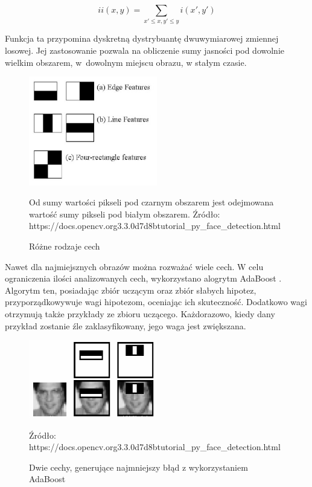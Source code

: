\documentclass[oneside, eng]{mgr}
\begin{document}
\begin{equation}
	ii(x,y) = \sum_{x' \leq x, y' \leq y} i(x',y')
\end{equation}

Funkcja ta przypomina dyskretną dystrybuantę dwuwymiarowej zmiennej losowej. Jej zastosowanie pozwala na obliczenie sumy jasności pod dowolnie wielkim obszarem, w~dowolnym miejscu obrazu, w stałym czasie.

\begin{figure}
\centering
	\includegraphics[width=0.50\textwidth,natwidth=610,natheight=642]{img/haar_features.jpg}\par\vspace{0.5cm}
\caption{Różne rodzaje cech}
Od sumy wartości pikseli pod czarnym obszarem jest odejmowana wartość sumy pikseli pod białym obszarem.
Źródło: https://docs.opencv.org\/3.3.0\/d7\/d8b\/tutorial\_py\_face\_detection.html
	\label{fig:features}
\end{figure}

Nawet dla najmiejsznych obrazów można rozważać wiele cech. W celu ograniczenia ilości analizowanych cech, wykorzystano alogrytm AdaBoost \cite{AdaBoost}. Algorytm ten, posiadając zbiór uczącym oraz zbiór słabych hipotez, przyporządkowywuje wagi hipotezom, oceniając ich skuteczność. Dodatkowo wagi otrzymują także przykłady ze zbioru uczącego. Każdorazowo, kiedy dany przykład zostanie źle zaklasyfikowany, jego waga jest zwiększana. 


\begin{figure}
\centering
	\includegraphics[width=0.50\textwidth,natwidth=610,natheight=642]{img/haar.png}\par\vspace{1cm}
\caption{Dwie cechy, generujące najmniejszy błąd z wykorzystaniem AdaBoost}
Źródło: https://docs.opencv.org\/3.3.0\/d7\/d8b\/tutorial\_py\_face\_detection.html
	\label{fig:best_features}
\end{figure}
\end{document}
